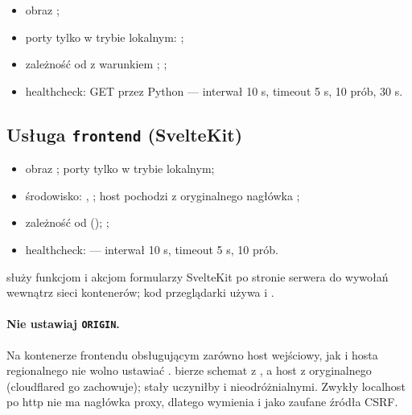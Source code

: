 \begin{itemize}
  \item obraz ;
  \item porty tylko w trybie lokalnym: ;
  \item zależność od  z warunkiem ; ;
  \item healthcheck: GET  przez Python  --- interwał 10 s, timeout 5 s, 10 prób,  30 s.
\end{itemize}

\subsection{Usługa \texttt{frontend} (SvelteKit)}

\begin{itemize}
  \item obraz ; porty tylko w trybie lokalnym;
  \item środowisko: , ; host pochodzi z oryginalnego nagłówka ;
  \item zależność od  (); ;
  \item healthcheck:  --- interwał 10 s, timeout 5 s, 10 prób.
\end{itemize}

 służy funkcjom  i akcjom formularzy SvelteKit
po stronie serwera do wywołań wewnątrz sieci kontenerów; kod przeglądarki używa
 i .

\paragraph{Nie ustawiaj \texttt{ORIGIN}.} Na kontenerze frontendu obsługującym
zarówno host wejściowy, jak i hosta regionalnego nie wolno ustawiać .
 bierze schemat z , a host z
oryginalnego  (cloudflared go zachowuje); stały  uczyniłby
 i  nieodróżnialnymi. Zwykły
localhost po http nie ma nagłówka proxy, dlatego 
wymienia  i  jako zaufane
źródła CSRF.

